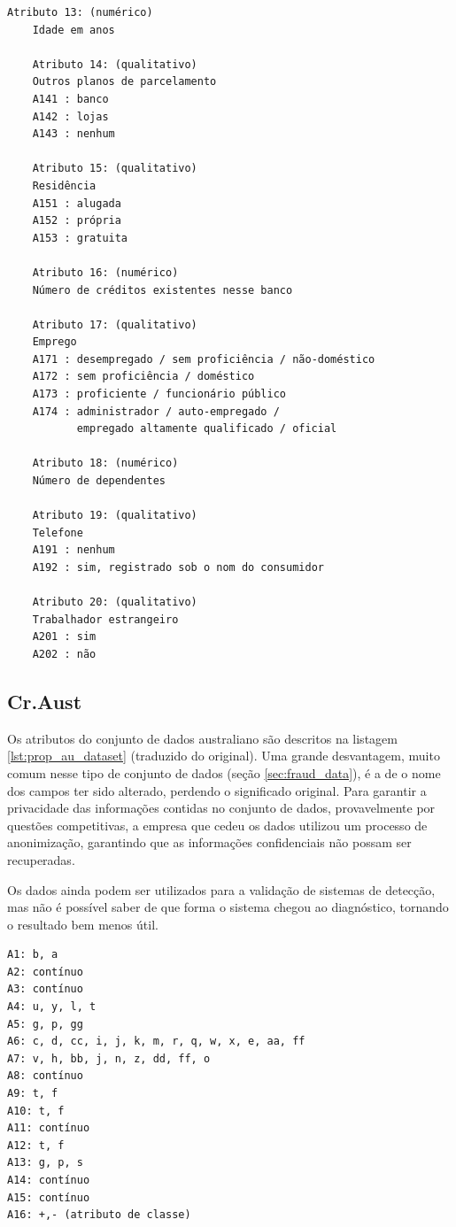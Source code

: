 \begin{lstlisting}[caption=Atributos do conjunto de dados alemão,label=lst:ge_dataset]
    Atributo 13: (numérico)
    Idade em anos

    Atributo 14: (qualitativo)
    Outros planos de parcelamento
    A141 : banco
    A142 : lojas
    A143 : nenhum

    Atributo 15: (qualitativo)
    Residência
    A151 : alugada
    A152 : própria
    A153 : gratuita

    Atributo 16: (numérico)
    Número de créditos existentes nesse banco

    Atributo 17: (qualitativo)
    Emprego
    A171 : desempregado / sem proficiência / não-doméstico
    A172 : sem proficiência / doméstico
    A173 : proficiente / funcionário público
    A174 : administrador / auto-empregado /
           empregado altamente qualificado / oficial

    Atributo 18: (numérico)
    Número de dependentes

    Atributo 19: (qualitativo)
    Telefone
    A191 : nenhum
    A192 : sim, registrado sob o nom do consumidor

    Atributo 20: (qualitativo)
    Trabalhador estrangeiro
    A201 : sim
    A202 : não
\end{lstlisting}
\vspace{0.5cm}

\subsection{Cr.Aust}

Os atributos do conjunto de dados australiano são descritos na listagem \ref{lst:prop_au_dataset} (traduzido do original). Uma grande desvantagem, muito comum nesse tipo de conjunto de dados (seção \ref{sec:fraud_data}), é a de o nome dos campos ter sido alterado, perdendo o significado original. Para garantir a privacidade das informações contidas no conjunto de dados, provavelmente por questões competitivas, a empresa que cedeu os dados utilizou um processo de anonimização, garantindo que as informações confidenciais não possam ser recuperadas.

Os dados ainda podem ser utilizados para a validação de sistemas de detecção, mas não é possível saber de que forma o sistema chegou ao diagnóstico, tornando o resultado bem menos útil.

\vspace{0.5cm}
\begin{lstlisting}[caption=Atributos do conjunto de dados Cr.Aust, label=lst:prop_au_dataset]
A1: b, a
A2: contínuo
A3: contínuo
A4: u, y, l, t
A5: g, p, gg
A6: c, d, cc, i, j, k, m, r, q, w, x, e, aa, ff
A7: v, h, bb, j, n, z, dd, ff, o
A8: contínuo
A9: t, f
A10: t, f
A11: contínuo
A12: t, f
A13: g, p, s
A14: contínuo
A15: contínuo
A16: +,- (atributo de classe)
\end{lstlisting}
\vspace{0.5cm}

